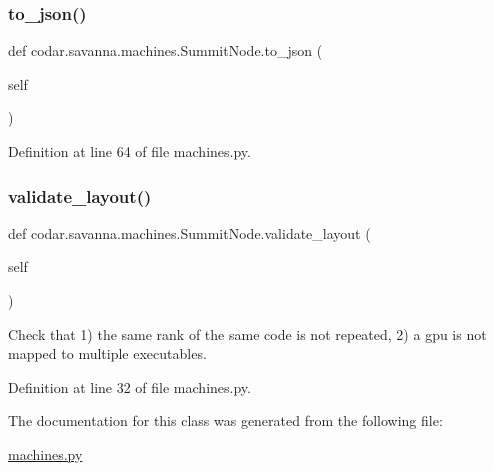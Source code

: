 \subsubsection{\texorpdfstring{to\+\_\+json()}{to\_json()}}
{\footnotesize\ttfamily def codar.\+savanna.\+machines.\+Summit\+Node.\+to\+\_\+json (\begin{DoxyParamCaption}\item[{}]{self }\end{DoxyParamCaption})}



Definition at line 64 of file machines.\+py.

\mbox{\label{classcodar_1_1savanna_1_1machines_1_1_summit_node_a3360461b2a21624400e0ecdf052c8447}} 
\subsubsection{\texorpdfstring{validate\+\_\+layout()}{validate\_layout()}}
{\footnotesize\ttfamily def codar.\+savanna.\+machines.\+Summit\+Node.\+validate\+\_\+layout (\begin{DoxyParamCaption}\item[{}]{self }\end{DoxyParamCaption})}

\begin{DoxyVerb}Check that 1) the same rank of the same code is not repeated,
2) a gpu is not mapped to multiple executables.\end{DoxyVerb}
 

Definition at line 32 of file machines.\+py.



The documentation for this class was generated from the following file\+:\begin{DoxyCompactItemize}
\item 
\hyperlink{machines_8py}{machines.\+py}\end{DoxyCompactItemize}
